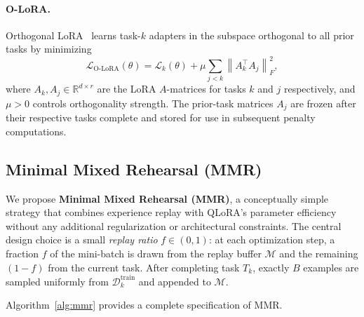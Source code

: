 \paragraph{O-LoRA.}
Orthogonal LoRA~\cite{wang2023olora} learns task-$k$ adapters in the subspace orthogonal to all
prior tasks by minimizing
\begin{equation}
  \mathcal{L}_{\mathrm{O\text{-}LoRA}}(\theta)
    = \mathcal{L}_k(\theta)
    + \mu \sum_{j < k} \left\| A_k^\top A_j \right\|_F^2,
  \label{eq:olora}
\end{equation}
where $A_k, A_j \in \mathbb{R}^{d \times r}$ are the LoRA $A$-matrices for tasks $k$ and $j$
respectively, and $\mu > 0$ controls orthogonality strength.
The prior-task matrices $A_j$ are frozen after their respective tasks complete and stored for use
in subsequent penalty computations.

\subsection{Minimal Mixed Rehearsal (MMR)}
\label{sec:mmr}

We propose \textbf{Minimal Mixed Rehearsal (MMR)}, a conceptually simple strategy that combines
experience replay with QLoRA's parameter efficiency without any additional regularization or
architectural constraints.
The central design choice is a small \emph{replay ratio} $f \in (0,1)$: at each optimization step,
a fraction $f$ of the mini-batch is drawn from the replay buffer $\mathcal{M}$ and the remaining
$(1-f)$ from the current task.
After completing task $T_k$, exactly $B$ examples are sampled uniformly from
$\mathcal{D}_k^{\mathrm{train}}$ and appended to $\mathcal{M}$.

Algorithm~\ref{alg:mmr} provides a complete specification of MMR.


